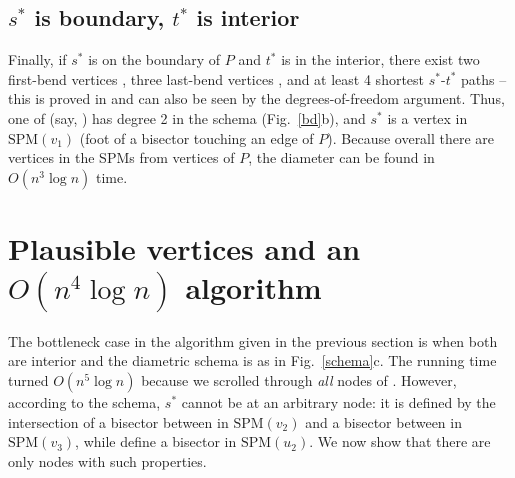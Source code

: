 \documentclass{llncs}
\newcommand{\e}[1]{\emph{#1}}
\renewcommand\-{\textrm{-}}
\renewcommand{\O}[1]{\ensuremath{O(#1 \log n)}\xspace}
\renewcommand\P{\ensuremath{P}\xspace}
\newcommand{\spm}[1]{\ensuremath{\textrm{SPM}(#1)}\xspace}
\renewcommand\ss{\ensuremath{s^*}\xspace}
\renewcommand\tt{\ensuremath{t^*}\xspace}
\begin{document}
\subsection{\ss is boundary, \tt is interior}
Finally, if \ss is on the boundary of \P and \tt is in the interior, there exist two first-bend vertices , three last-bend vertices , and at least 4 shortest \ss-\tt paths -- this is proved in \cite[Theorem~2]{bae} and can also be seen by the degrees-of-freedom argument. Thus, one of  (say, ) has degree 2 in the schema (Fig.~\ref{bd}b), and \ss is a vertex in \spm{v_1} (foot of a bisector touching an edge of \P). Because overall there are  vertices in the SPMs from vertices of \P, the diameter can be found in \O{n^3} time.




\section{Plausible vertices and an \O{n^{4}} algorithm}\label{faster} 

The bottleneck case in the algorithm given in the previous section 
is when both  are interior and the diametric schema
is as in Fig.~\ref{schema}c. The running time turned \O{n^5} because we scrolled
through \e{all}  nodes of . However, according to the schema,
\ss cannot be at an arbitrary node: it is defined by the intersection of a
bisector between  in \spm{v_2} and a bisector between  in
\spm{v_3}, while  define a bisector in \spm{u_2}. We now show that
there are only  nodes with such properties.
\end{document}
